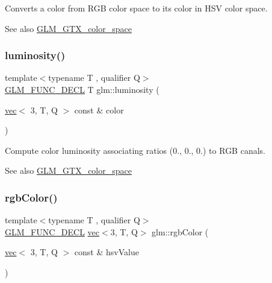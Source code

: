 Converts a color from R\+GB color space to its color in H\+SV color space. \begin{DoxySeeAlso}{See also}
\mbox{\hyperlink{group__gtx__color__space}{G\+L\+M\+\_\+\+G\+T\+X\+\_\+color\+\_\+space}} 
\end{DoxySeeAlso}
\mbox{\label{group__gtx__color__space_gad028e0a4f1a9c812b39439b746295b34}} 
\subsubsection{\texorpdfstring{luminosity()}{luminosity()}}
{\footnotesize\ttfamily template$<$typename T , qualifier Q$>$ \\
\mbox{\hyperlink{setup_8hpp_ab2d052de21a70539923e9bcbf6e83a51}{G\+L\+M\+\_\+\+F\+U\+N\+C\+\_\+\+D\+E\+CL}} T glm\+::luminosity (\begin{DoxyParamCaption}\item[{\mbox{\hyperlink{structglm_1_1vec}{vec}}$<$ 3, T, Q $>$ const \&}]{color }\end{DoxyParamCaption})}

Compute color luminosity associating ratios (0., 0., 0.) to R\+GB canals. \begin{DoxySeeAlso}{See also}
\mbox{\hyperlink{group__gtx__color__space}{G\+L\+M\+\_\+\+G\+T\+X\+\_\+color\+\_\+space}} 
\end{DoxySeeAlso}
\mbox{\label{group__gtx__color__space_ga5f9193be46f45f0655c05a0cdca006db}} 
\subsubsection{\texorpdfstring{rgb\+Color()}{rgbColor()}}
{\footnotesize\ttfamily template$<$typename T , qualifier Q$>$ \\
\mbox{\hyperlink{setup_8hpp_ab2d052de21a70539923e9bcbf6e83a51}{G\+L\+M\+\_\+\+F\+U\+N\+C\+\_\+\+D\+E\+CL}} \mbox{\hyperlink{structglm_1_1vec}{vec}}$<$3, T, Q$>$ glm\+::rgb\+Color (\begin{DoxyParamCaption}\item[{\mbox{\hyperlink{structglm_1_1vec}{vec}}$<$ 3, T, Q $>$ const \&}]{hsv\+Value }\end{DoxyParamCaption})}

